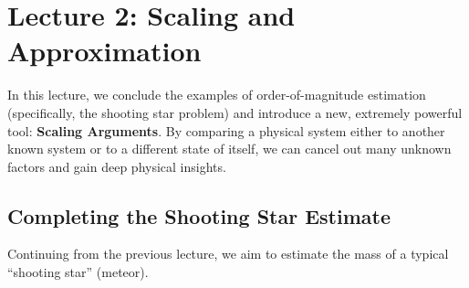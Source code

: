 \section{Lecture 2: Scaling and Approximation}
\date{16/04/2026}
In this lecture, we conclude the examples of order-of-magnitude estimation (specifically, the shooting star problem) and introduce a new, extremely powerful tool: \textbf{Scaling Arguments}. By comparing a physical system either to another known system or to a different state of itself, we can cancel out many unknown factors and gain deep physical insights.

\subsection{Completing the Shooting Star Estimate}

Continuing from the previous lecture, we aim to estimate the mass of a typical ``shooting star'' (meteor).

